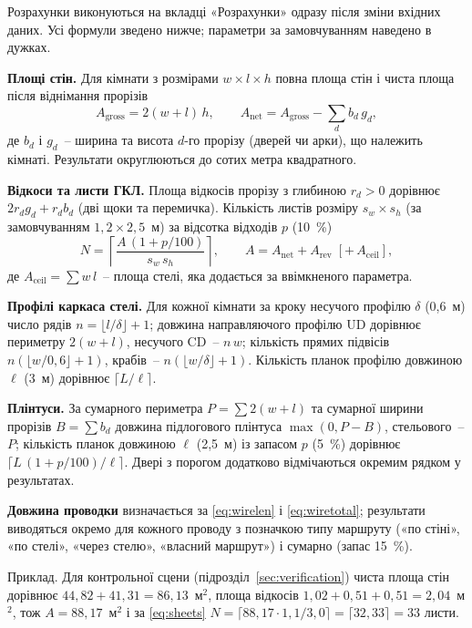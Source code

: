 
Розрахунки виконуються на вкладці «Розрахунки» одразу після зміни вхідних даних. Усі формули зведено нижче; параметри за замовчуванням наведено в дужках.

\textbf{Площі стін.} Для кімнати з розмірами $w\times l\times h$ повна площа стін і чиста площа після віднімання прорізів
\begin{equation}\label{eq:area}
    A_{\mathrm{gross}} = 2(w+l)\,h, \qquad A_{\mathrm{net}} = A_{\mathrm{gross}} - \sum_{d} b_d\, g_d ,
\end{equation}
де $b_d$ і $g_d$~-- ширина та висота $d$-го прорізу (дверей чи арки), що належить кімнаті. Результати округлюються до сотих метра квадратного.

\textbf{Відкоси та листи ГКЛ.} Площа відкосів прорізу з глибиною $r_d>0$ дорівнює $2 r_d g_d + r_d b_d$ (дві щоки та перемичка). Кількість листів розміру $s_w\times s_h$ (за замовчуванням $1{,}2\times2{,}5$~м) за відсотка відходів $p$ (10~\%)
\begin{equation}\label{eq:sheets}
    N = \left\lceil \frac{A\,(1+p/100)}{s_w\, s_h} \right\rceil , \qquad A = A_{\mathrm{net}} + A_{\mathrm{rev}} \;[+\,A_{\mathrm{ceil}}],
\end{equation}
де $A_{\mathrm{ceil}}=\sum w\,l$~-- площа стелі, яка додається за ввімкненого параметра.

\textbf{Профілі каркаса стелі.} Для кожної кімнати за кроку несучого профілю $\delta$ (0,6~м) число рядів $n=\lfloor l/\delta\rfloor+1$; довжина направляючого профілю UD дорівнює периметру $2(w+l)$, несучого CD~-- $n\,w$; кількість прямих підвісів $n(\lfloor w/0{,}6\rfloor+1)$, крабів~-- $n(\lfloor w/\delta\rfloor+1)$. Кількість планок профілю довжиною $\ell$ (3~м) дорівнює $\lceil L/\ell\rceil$.

\textbf{Плінтуси.} За сумарного периметра $P=\sum 2(w+l)$ та сумарної ширини прорізів $B=\sum b_d$ довжина підлогового плінтуса $\max(0,P-B)$, стельового~-- $P$; кількість планок довжиною $\ell$ (2,5~м) із запасом $p$ (5~\%) дорівнює $\lceil L\,(1+p/100)/\ell\rceil$. Двері з порогом додатково відмічаються окремим рядком у результатах.

\textbf{Довжина проводки} визначається за \eqref{eq:wirelen} і \eqref{eq:wiretotal}; результати виводяться окремо для кожного проводу з позначкою типу маршруту («по стіні», «по стелі», «через стелю», «власний маршрут») і сумарно (запас 15~\%).

Приклад. Для контрольної сцени (підрозділ~\ref{sec:verification}) чиста площа стін дорівнює $44{,}82+41{,}31=86{,}13$~м$^2$, площа відкосів $1{,}02+0{,}51+0{,}51=2{,}04$~м$^2$, тож $A=88{,}17$~м$^2$ і за \eqref{eq:sheets} $N=\lceil 88{,}17\cdot1{,}1/3{,}0\rceil=\lceil 32{,}33\rceil=33$ листи.

